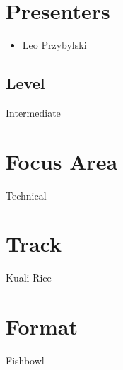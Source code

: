 \documentclass[12pt,notitlepage]{article}
\begin{document}
\section{Presenters}
\begin{itemize}
\item Leo Przybylski
\end{itemize}

\subsection{Level}
Intermediate

\section{Focus Area}
Technical

\section{Track}
Kuali Rice


\section{Format}
Fishbowl
\end{document}
